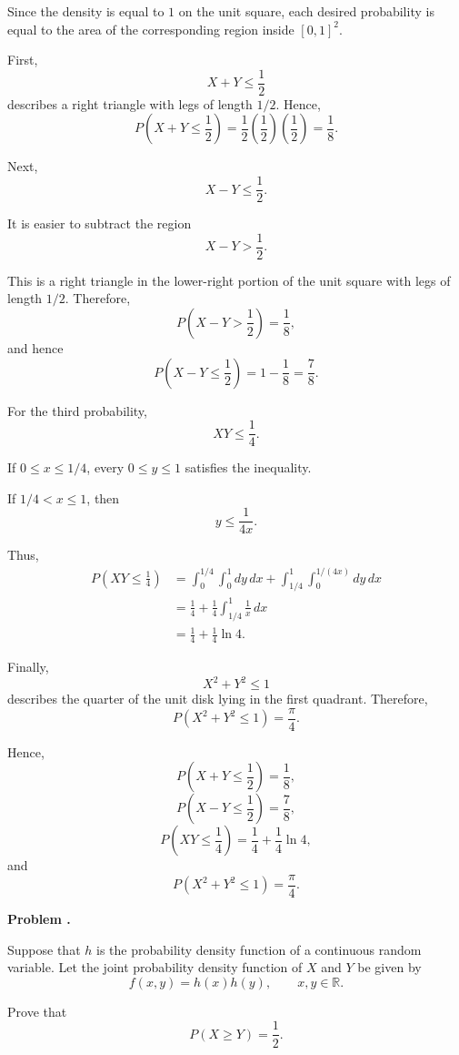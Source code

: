 \documentclass[11pt]{article}
\newcounter{problem}
\newenvironment{problem}[1][]{
    \refstepcounter{problem}
    \begin{problemheader}
        \textbf{Problem \theproblem%
        \if\relax\detokenize{#1}\relax
        \else. #1%
        \fi}
    \end{problemheader}
}{
    \vspace{0.5em}
}
\newenvironment{solution}{
    \par
    \begin{tcolorbox}[
        colback=white,
        colframe=uwgold,
        boxrule=0.7pt,
        arc=2mm,
        left=3mm,
        right=3mm,
        top=2mm,
        bottom=2mm,
        breakable,
        before skip=0.5em,
        after skip=1em,
        title=\textbf{Solution},
        coltitle=uwpurple,
        fonttitle=\bfseries
    ]
}{
    \end{tcolorbox}
}
\begin{document}
\begin{solution}

Since the density is equal to \(1\) on the unit square, each desired
probability is equal to the area of the corresponding region inside
\([0,1]^2\).

First,
\[
X+Y\leq\frac12
\]
describes a right triangle with legs of length \(1/2\). Hence,
\[
P\left(X+Y\leq\frac12\right)
=
\frac12\left(\frac12\right)\left(\frac12\right)
=
\frac18.
\]

Next,
\[
X-Y\leq\frac12.
\]

It is easier to subtract the region
\[
X-Y>\frac12.
\]

This is a right triangle in the lower-right portion of the unit square with
legs of length \(1/2\). Therefore,
\[
P\left(X-Y>\frac12\right)=\frac18,
\]
and hence
\[
P\left(X-Y\leq\frac12\right)
=
1-\frac18
=
\frac78.
\]

For the third probability,
\[
XY\leq\frac14.
\]

If \(0\leq x\leq1/4\), every \(0\leq y\leq1\) satisfies the inequality.

If \(1/4<x\leq1\), then
\[
y\leq\frac{1}{4x}.
\]

Thus,
\[
\begin{aligned}
P\left(XY\leq\frac14\right)
&=
\int_0^{1/4}\int_0^1dy\,dx
+
\int_{1/4}^{1}\int_0^{1/(4x)}dy\,dx\\
&=
\frac14
+
\frac14\int_{1/4}^{1}\frac1x\,dx\\
&=
\frac14+\frac14\ln4.
\end{aligned}
\]

Finally,
\[
X^2+Y^2\leq1
\]
describes the quarter of the unit disk lying in the first quadrant.
Therefore,
\[
P(X^2+Y^2\leq1)
=
\frac{\pi}{4}.
\]

Hence,
\[
P\left(X+Y\leq\frac12\right)=\frac18,
\]
\[
P\left(X-Y\leq\frac12\right)=\frac78,
\]
\[
P\left(XY\leq\frac14\right)
=
\frac14+\frac14\ln4,
\]
and
\[
P(X^2+Y^2\leq1)=\frac{\pi}{4}.
\]

\end{solution}



\newpage
\begin{problem}

Suppose that \(h\) is the probability density function of a continuous random
variable. Let the joint probability density function of \(X\) and \(Y\) be
given by
\[
f(x,y)=h(x)h(y),
\qquad
x,y\in\mathbb R.
\]

Prove that
\[
P(X\geq Y)=\frac12.
\]

\end{problem}
\end{document}
